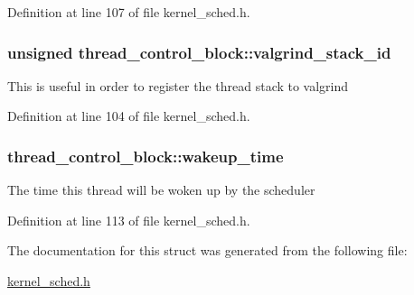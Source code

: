 Definition at line 107 of file kernel\+\_\+sched.\+h.

\subsubsection[{\texorpdfstring{valgrind\+\_\+stack\+\_\+id}{valgrind_stack_id}}]{\setlength{\rightskip}{0pt plus 5cm}unsigned thread\+\_\+control\+\_\+block\+::valgrind\+\_\+stack\+\_\+id}\hypertarget{structthread__control__block_ad8a2da36c0ad775c12c5f66f4fec9d41}{}\label{structthread__control__block_ad8a2da36c0ad775c12c5f66f4fec9d41}
This is useful in order to register the thread stack to valgrind 

Definition at line 104 of file kernel\+\_\+sched.\+h.

\subsubsection[{\texorpdfstring{wakeup\+\_\+time}{wakeup_time}}]{ thread\+\_\+control\+\_\+block\+::wakeup\+\_\+time}\hypertarget{structthread__control__block_a7dbf9ba7df67911abb7951e249f587b6}{}\label{structthread__control__block_a7dbf9ba7df67911abb7951e249f587b6}
The time this thread will be woken up by the scheduler 

Definition at line 113 of file kernel\+\_\+sched.\+h.



The documentation for this struct was generated from the following file\+:\begin{DoxyCompactItemize}
\item 
\hyperlink{kernel__sched_8h}{kernel\+\_\+sched.\+h}\end{DoxyCompactItemize}
